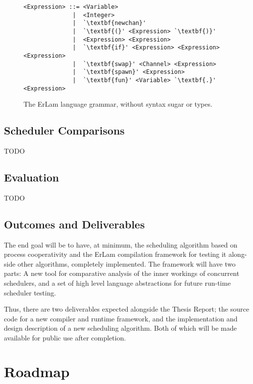 \begin{figure} %
\centering
\begin{BVerbatim}[commandchars=\\\{\}]
<Expression> ::= <Variable> 
              |  <Integer>
              |  `\textbf{newchan}'
              |  `\textbf{(}' <Expression> `\textbf{)}'
              |  <Expression> <Expression>
              |  `\textbf{if}' <Expression> <Expression> <Expression>
              |  `\textbf{swap}' <Channel> <Expression>
              |  `\textbf{spawn}' <Expression>
              |  `\textbf{fun}' <Variable> `\textbf{.}' <Expression>
\end{BVerbatim}
\caption{The ErLam language grammar, without syntax sugar or types.}
\label{fig:grammer}
\end{figure}


\subsection{Scheduler Comparisons}
\label{sec:schedwork}
TODO

\subsection{Evaluation}
\label{sec:workevaluation}
TODO

\pagebreak
\subsection{Outcomes and Deliverables}
\label{sec:outcomes}

The end goal will be to have, at minimum, the scheduling algorithm based on process cooperativity and 
the ErLam compilation framework for testing it along-side other algorithms, completely implemented. The 
framework will have two parts: A new tool for comparative analysis of the inner workings of concurrent 
schedulers, and a set of high level language abstractions for future run-time scheduler testing.

Thus, there are two deliverables expected alongside the Thesis Report; the source code for a new compiler 
and runtime framework, and the implementation and design description of a new scheduling algorithm. Both
of which will be made available for public use after completion.

\section{Roadmap}

